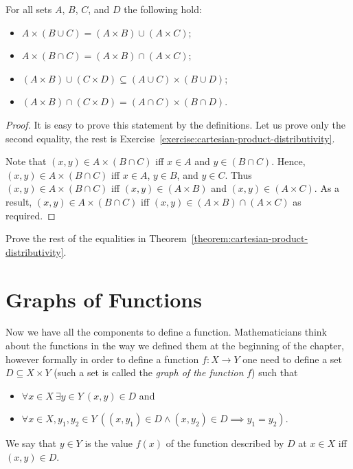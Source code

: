 \begin{theorem}
\label{theorem:cartesian-product-distributivity}
  For all sets $A$, $B$, $C$, and $D$ the following hold:
  \begin{itemize}
    \item $A \times (B \cup C) = (A \times B) \cup (A \times C)$;
    \item $A \times (B \cap C) = (A \times B) \cap (A \times C)$;
    \item $(A \times B) \cup (C \times D) \subseteq
      (A \cup C) \times (B \cup D)$;
    \item $(A \times B) \cap (C \times D) =
      (A \cap C) \times (B \cap D)$.
  \end{itemize}
\end{theorem}
\begin{proof}
  It is easy to prove this statement by the definitions. Let us prove only the
  second equality, the rest is
  Exercise~\ref{exercise:cartesian-product-distributivity}.

  Note that $(x, y) \in A \times (B \cap C)$ iff $x \in A$ and
  $y \in (B \cap C)$.
  Hence, $(x, y) \in A \times (B \cap C)$ iff $x \in A$, $y \in B$, and
  $y \in C$. Thus $(x, y) \in A \times (B \cap C)$ iff
  $(x, y) \in (A \times B)$ and $(x, y) \in (A \times C)$. As a result,
  $(x, y) \in A \times (B \cap C)$ iff
  $(x, y) \in (A \times B) \cap (A \times C)$ as required.
\end{proof}


\begin{exercise}
\label{exercise:cartesian-product-distributivity}
  Prove the rest of the equalities in
  Theorem~\ref{theorem:cartesian-product-distributivity}.
\end{exercise}


\section{Graphs of Functions}
\label{section:graph}
Now we have all the components to define a function. Mathematicians think about
the functions in the way we defined them at the beginning of the chapter,
however formally in order to define a function $f : X \to Y$ one need to define
a set $D \subseteq X \times Y$ (such a set is called the \emph{graph of the
function} $f$) such that
\begin{itemize}
  \item $\forall x \in X~\exists y \in Y\ (x, y) \in D$ and
  \item $\forall x \in X, y_1, y_2 \in Y\
    ((x, y_1) \in D \land (x, y_2) \in D \implies y_1 = y_2)$.
\end{itemize}
We say that $y \in Y$ is the value $f(x)$ of the function described by $D$ at
$x \in X$ iff $(x, y) \in D$.

